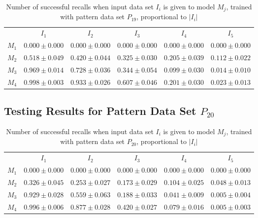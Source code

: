 \documentclass[anon]{CI}
\begin{document}
		\begin{table}[H]
			\centering
			\def\arraystretch{1.5}
			\footnotesize
			\begin{tabular}{cccccc}
				
				& $I_{1}$  & $I_{2}$  & $I_{3}$  & $I_{4}$  & $I_{5}$ \\ \cline{2-6}
				$M_{1}$  & $0.000\pm0.000$  & $0.000\pm0.000$  & $0.000\pm0.000$  & $0.000\pm0.000$  & $0.000\pm0.000$ \\
				$M_{2}$  & $0.518\pm0.049$  & $0.420\pm0.044$  & $0.325\pm0.030$  & $0.205\pm0.039$  & $0.112\pm0.022$ \\
				$M_{3}$  & $0.969\pm0.014$  & $0.728\pm0.036$  & $0.344\pm0.054$  & $0.099\pm0.030$  & $0.014\pm0.010$ \\
				$M_{4}$  & $0.998\pm0.003$  & $0.933\pm0.026$  & $0.607\pm0.046$  & $0.201\pm0.030$  & $0.023\pm0.013$ \\
				
			\end{tabular}
			\caption{Number of successful recalls when input data set $I_i$ is given to model $M_j$, trained with pattern data set $P_{19}$, proportional to $\left|I_i\right|$}
		\end{table}
		
		\subsection{Testing Results for Pattern Data Set $P_{20}$}
		
		
		\begin{table}[H]
			\centering
			\def\arraystretch{1.5}
			\footnotesize
			\begin{tabular}{cccccc}
				
				& $I_{1}$  & $I_{2}$  & $I_{3}$  & $I_{4}$  & $I_{5}$ \\ \cline{2-6}
				$M_{1}$  & $0.000\pm0.000$  & $0.000\pm0.000$  & $0.000\pm0.000$  & $0.000\pm0.000$  & $0.000\pm0.000$ \\
				$M_{2}$  & $0.326\pm0.045$  & $0.253\pm0.027$  & $0.173\pm0.029$  & $0.104\pm0.025$  & $0.048\pm0.013$ \\
				$M_{3}$  & $0.929\pm0.028$  & $0.559\pm0.063$  & $0.188\pm0.033$  & $0.041\pm0.009$  & $0.005\pm0.004$ \\
				$M_{4}$  & $0.996\pm0.006$  & $0.877\pm0.028$  & $0.420\pm0.027$  & $0.079\pm0.016$  & $0.005\pm0.003$ \\
				
			\end{tabular}
			\caption{Number of successful recalls when input data set $I_i$ is given to model $M_j$, trained with pattern data set $P_{20}$, proportional to $\left|I_i\right|$}
		\end{table}
		
\end{document}

